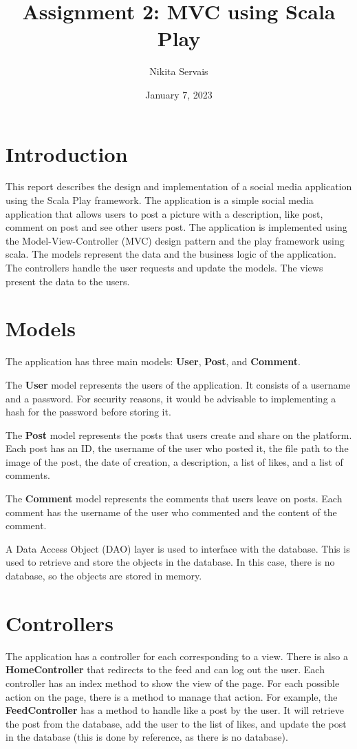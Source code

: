 \documentclass{article}
\author{Nikita Servais}
\title{Assignment 2: MVC using Scala Play}
\date{January 7, 2023}
\begin{document}
    \maketitle


    \section{Introduction}
    This report describes the design and implementation of a social media application using the Scala Play framework.
    The application is a simple social media application that allows users to post a picture with a description, like post, comment on post and see other users post.
    The application is implemented using the Model-View-Controller (MVC) design pattern and the play framework using scala.
    The models represent the data and the business logic of the application.
    The controllers handle the user requests and update the models.
    The views present the data to the users.


    \section{Models}
    The application has three main models: \textbf{User}, \textbf{Post}, and \textbf{Comment}.

    The \textbf{User} model represents the users of the application.
    It consists of a username and a password.
    For security reasons, it would be advisable to implementing a hash for the password before storing it.

    The \textbf{Post} model represents the posts that users create and share on the platform.
    Each post has an ID, the username of the user who posted it, the file path to the image of the post, the date of creation, a description, a list of likes, and a list of comments.


    The \textbf{Comment} model represents the comments that users leave on posts.
    Each comment has the username of the user who commented and the content of the comment.

    A Data Access Object (DAO) layer is used to interface with the database.
    This is used to retrieve and store the objects in the database.
    In this case, there is no database, so the objects are stored in memory.


    \section{Controllers}
    The application has a controller for each corresponding to a view.
    There is also a \textbf{HomeController} that redirects to the feed and can log out the user.
    Each controller has an index method to show the view of the page.
    For each possible action on the page, there is a method to manage that action.
    For example, the \textbf{FeedController} has a method to handle like a post by the user.
    It will retrieve the post from the database, add the user to the list of likes, and update the post in the database (this is done by reference, as there is no database).
\end{document}
